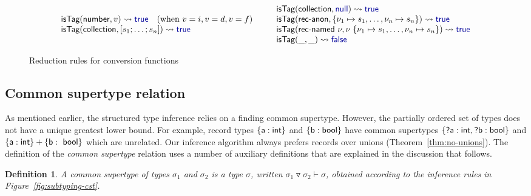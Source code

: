 \documentclass[preprint]{sigplanconf}
\newcommand{\kvd}[1]{\textnormal{\textcolor{kvdclr}{\sffamily #1}}}
\newcommand{\ident}[1]{\textnormal{\sffamily #1}}
\newcommand{\reduce}{\rightsquigarrow}
\newtheorem{definition}{Definition}
\begin{document}
\begin{figure}
\begin{equation*}
\begin{array}{l}
 \ident{isTag}(\ident{number}, v) \reduce \kvd{true} \quad(\textnormal{when}~v=i, v=d, v=f) \\
 \ident{isTag}(\ident{collection}, [s_1; \ldots; s_n]) \reduce \kvd{true} \\
\end{array}
\hspace{1.8em}
\begin{array}{l}
 \ident{isTag}(\ident{collection}, \kvd{null}) \reduce \kvd{true} \\
 \ident{isTag}(\ident{rec-anon}, \{ \nu_1\mapsto s_1, \ldots, \nu_n\mapsto s_n \}) \reduce \kvd{true} \\
 \ident{isTag}(\ident{rec-named}~\nu, \nu\;\{ \nu_1\mapsto s_1, \ldots, \nu_n\mapsto s_n \}) \reduce \kvd{true} \\
 \ident{isTag}(\_, \_) \reduce \kvd{false} \\
\end{array}
\end{equation*}

\caption{Reduction rules for conversion functions}
\label{fig:op-conversions}
\end{figure}


\subsection{Common supertype relation}
\label{sec:inference-commonsuper}

As mentioned earlier, the structured type inference relies on a finding common supertype. However,
the partially ordered set of types does not have a unique greatest lower bound. For example, record types
$\{\ident{a}:\ident{int}\}$ and $\{\ident{b}:\ident{bool}\}$ have common supertypes
$\{\ident{?a}:\ident{int}, \ident{?b}:\ident{bool}\}$ and $\{\ident{a}:\ident{int}\} + \{\ident{b}:\ident{bool}\}$
which are unrelated. Our inference algorithm always prefers records over unions (Theorem~\ref{thm:no-unions}). 
The definition of the \emph{common supertype} relation uses a number of auxiliary definitions 
that are explained in the discussion that follows.

\begin{definition}
A \emph{common supertype} of types $\sigma_1$ and $\sigma_2$ is a type $\sigma$, written 
$\sigma_1 \triangledown \sigma_2 \vdash \sigma$, obtained according to the inference rules in 
Figure~\ref{fig:subtyping-cst}.
\end{definition}
\end{document}
